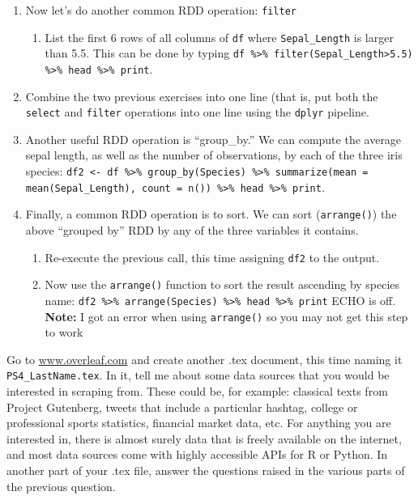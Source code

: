 \documentclass[12pt,english]{exam}
\begin{document}
\begin{questions}
\begin{enumerate}
\begin{enumerate}
    \end{enumerate}
    \item Now let's do another common RDD operation: \texttt{filter} 
    \begin{enumerate}
         \item List the first 6 rows of all columns of \texttt{df} where \texttt{Sepal\_Length} is larger than 5.5. This can be done by typing \texttt{df  \%>\% filter(Sepal\_Length>5.5) \%>\% head \%>\% print}.
    \end{enumerate}
    \item Combine the two previous exercises into one line (that is, put both the \texttt{select} and \texttt{filter} operations into one line using the \texttt{dplyr} pipeline.
    \item Another useful RDD operation is ``group\_by.'' We can compute the average sepal length, as well as the number of observations, by each of the three iris species: \texttt{df2 <- df \%>\% group\_by(Species) \%>\% summarize(mean  = mean(Sepal\_Length), count = n()) \%>\% head \%>\% print}.
    \item Finally, a common RDD operation is to sort. We can sort (\texttt{arrange()}) the above ``grouped by'' RDD by any of the three variables it contains.
    \begin{enumerate}
        \item Re-execute the previous call, this time assigning \texttt{df2} to the output.
        \item Now use the \texttt{arrange()} function to sort the result ascending by species name: \texttt{df2 \%>\% arrange(Species) \%>\% head \%>\% print}
ECHO is off.
            \textbf{Note: } I got an error when using \texttt{arrange()} so you may not get this step to work
    \end{enumerate}
\end{enumerate}
\question Go to \url{www.overleaf.com} and create another .tex document, this time naming it \texttt{PS4\_LastName.tex}. In it, tell me about some data sources that you would be interested in scraping from. These could be, for example: classical texts from Project Gutenberg, tweets that include a particular hashtag, college or professional sports statistics, financial market data, etc. For anything you are interested in, there is almost surely data that is freely available on the internet, and most data sources come with highly accessible APIs for R or Python.
In another part of your .tex file, answer the questions raised in the various parts of the previous question.

\end{questions}
\end{document}
